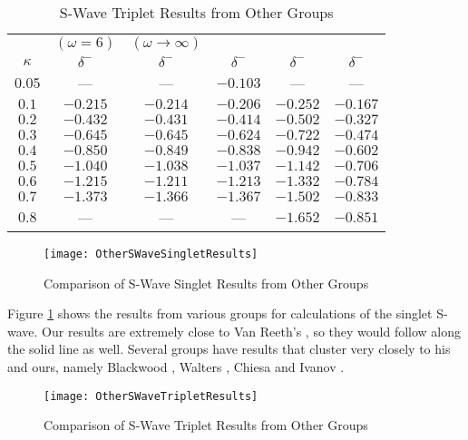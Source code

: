 \documentclass[Dissertation.tex]{subfiles}
\begin{document}
\begin{table}[H]
\begin{center}
\begin{tabular}{c c c c c c}
\toprule
 & $(\omega = 6)$ & $(\omega \rightarrow \infty)$ &  &  &   \\
$\kappa$ & $\delta^-$ \cite{VanReeth2003} & $\delta^-$ \cite{VanReeth2003} & $\delta^-$ \cite{Blackwood2002} & $\delta^-$ \cite{Ray1997} & $\delta^-$ \cite{Adhikari1999} \\
\midrule
$0.05$ & --- & --- & $-0.103$ & --- & --- \\
$0.1$ & $-0.215$ & $-0.214$ & $-0.206$ & $-0.252$ & $-0.167$ \\
$0.2$ & $-0.432$ & $-0.431$ & $-0.414$ & $-0.502$ & $-0.327$ \\
$0.3$ & $-0.645$ & $-0.645$ & $-0.624$ & $-0.722$ & $-0.474$ \\
$0.4$ & $-0.850$ & $-0.849$ & $-0.838$ & $-0.942$ & $-0.602$ \\
$0.5$ & $-1.040$ & $-1.038$ & $-1.037$ & $-1.142$ & $-0.706$ \\
$0.6$ & $-1.215$ & $-1.211$ & $-1.213$ & $-1.332$ & $-0.784$ \\
$0.7$ & $-1.373$ & $-1.366$ & $-1.367$ & $-1.502$ & $-0.833$ \\
$0.8$ &    --- &    --- &    --- & $-1.652$ & $-0.851$ \\
\bottomrule
\end{tabular}
\caption{S-Wave Triplet Results from Other Groups}
\label{tab:SWaveTripletOther}
\end{center}
\end{table}


\begin{figure}[H]
	\centering
	\texttt{[image: OtherSWaveSingletResults]}
	\caption{Comparison of S-Wave Singlet Results from Other Groups}
	\label{fig:OtherSWaveSingletResults}
\end{figure}

Figure \ref{fig:OtherSWaveSingletResults} shows the results from various groups for calculations of the singlet S-wave.  Our results are extremely close to Van Reeth's \cite{VanReeth2003}, so they would follow along the solid line as well.  Several groups have results that cluster very closely to his and ours, namely Blackwood \cite{Blackwood2002}, Walters \cite{Walters2004}, Chiesa \cite{Chiesa2002} and Ivanov \cite{Ivanov2002}.

\begin{figure}[H]
	\centering
	\texttt{[image: OtherSWaveTripletResults]}
	\caption{Comparison of S-Wave Triplet Results from Other Groups}
	\label{fig:OtherSWaveTripletResults}
\end{figure}
\end{document}
